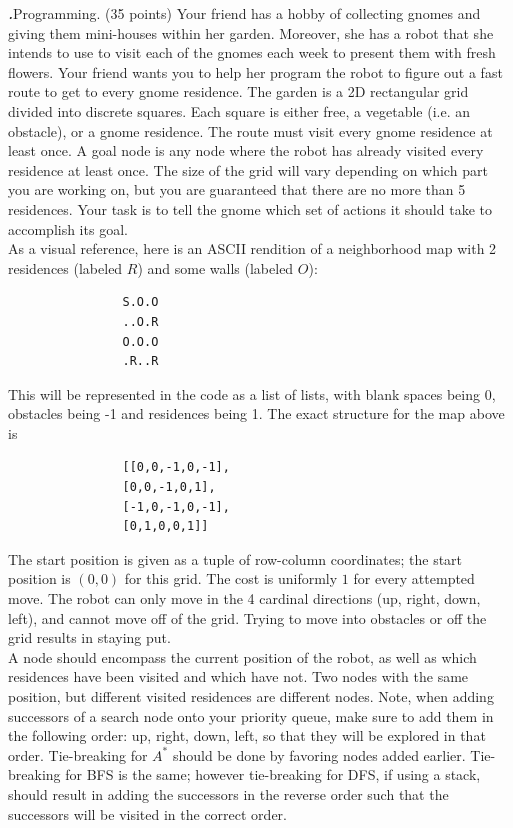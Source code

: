 \documentclass[12pt]{amsart}
\newenvironment{statement}[1]{\smallskip\noindent\color[rgb]{0.0,0.0,0.0} {\bf #1.}}{}
\theoremstyle{definition}
\theoremstyle{remark}
\newcommand{\1}{\mathds{1}}
\begin{document}
\newpage
\begin{statement}{5}
\emph{Programming.} (35 points) Your friend has a hobby of collecting gnomes and giving them mini-houses within her garden. Moreover, she has a robot that she intends to use to visit each of the gnomes each week to present them with fresh flowers. Your friend wants you to help her program the robot to figure out a fast route to get to every gnome residence. The garden is a 2D rectangular grid divided into discrete squares. Each square is either free, a vegetable (i.e. an obstacle), or a gnome residence. The route must visit every gnome residence at least once. A goal node is any node
where the robot has already visited every residence at least once.
The size of the grid will vary depending on which part you are working on, but you are guaranteed that there are no more than 5 residences.
Your task is to tell the gnome which set of actions it should take to accomplish its goal.\\

\noindent
As a visual reference, here is an ASCII rendition of a neighborhood map with 2 residences (labeled $R$) and some
walls (labeled $O$):

\begin{lstlisting}
                S.O.O
                ..O.R
                O.O.O
                .R..R
\end{lstlisting}

\noindent
This will be represented in the code as a list of lists, with blank spaces being 0, obstacles being -1 and
residences being 1. The exact structure for the map above is

\begin{lstlisting}
                [[0,0,-1,0,-1],
                [0,0,-1,0,1],
                [-1,0,-1,0,-1],
                [0,1,0,0,1]]
\end{lstlisting}

\noindent
The start position is given as a tuple of row-column coordinates; the start position is $(0,0)$ for this grid.
The cost is uniformly $1$ for every attempted move. The robot can only move in the 4 cardinal directions
(up, right, down, left), and cannot move off of the grid. Trying to move into obstacles or off the grid results in staying put.\\

\noindent
A node should encompass the current position of the robot, as well as which residences have been visited and which have not. Two nodes with the same position, but different visited residences are different nodes.
Note, when adding successors of a search node onto your priority queue, make sure to add them in the
following order: up, right, down, left, so that they will be explored in that order. Tie-breaking for $A^*$ should be done by favoring nodes added earlier. Tie-breaking for BFS is the same; however tie-breaking for DFS, if using a stack, should result in adding the successors in the reverse order such that the successors will be visited in the correct order. \\



\end{statement}
\end{document}
